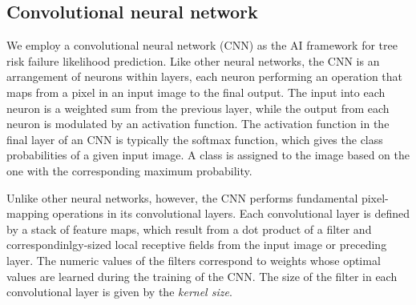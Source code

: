 \documentclass[Journal,letterpaper, SingleSpace, InsideFigs]{ascelike-new}
\begin{document}
\subsection{Convolutional neural network}
We employ a convolutional neural network (CNN) as the AI framework for tree risk failure likelihood prediction.
Like other neural networks, the CNN is an arrangement of neurons within layers, each neuron performing an operation that maps from a pixel in an input image to the final output. 
The input into each neuron is a weighted sum from the previous layer, while the output from each neuron is modulated by an activation function.
The activation function in the final layer of an CNN is typically the softmax function, which gives the class probabilities of a given input image. 
A class is assigned to the image based on the one with the corresponding maximum probability.

Unlike other neural networks, however, the CNN performs fundamental pixel-mapping operations in its convolutional
layers. Each convolutional layer is defined by a stack of feature maps, which result from a dot product of a filter and
correspondinlgy-sized local receptive fields from the input image or preceding layer.  The numeric values of the filters
correspond to weights whose optimal values are learned during the training of the CNN.  The size of the filter in each
convolutional layer is given by the \textit{kernel size}.
\end{document}
